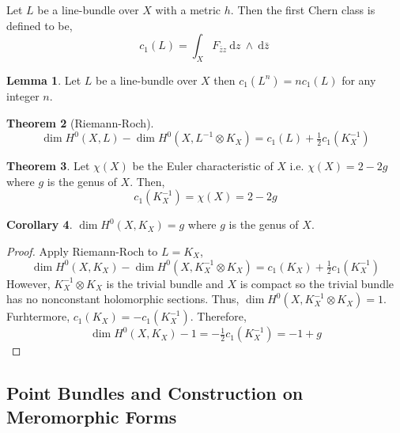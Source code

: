 \documentclass[12pt]{extarticle}
\renewcommand{\d}[1]{\: \mathrm{d}#1 \:}
\theoremstyle{definition}
\newtheorem{theorem}{Theorem}[section]
\newtheorem{lemma}[theorem]{Lemma}
\newtheorem{corollary}[theorem]{Corollary}
\newenvironment{definition}[1][Definition:]{\begin{trivlist}
\item[\hskip \labelsep {\bfseries #1}]}{\end{trivlist}}
\begin{document}
\begin{definition}
Let $L$ be a line-bundle over $X$ with a metric $h$. Then the first Chern class is defined to be,
\[ c_1(L) = \int_X F_{\bar{z}z} \d{z} \wedge \d{\bar{z}} \]
\end{definition}

\begin{lemma}
Let $L$ be a line-bundle over $X$ then $c_1(L^n) = n c_1(L)$ for any integer $n$. 
\end{lemma}


\begin{theorem}[Riemann-Roch]
\[ \dim{H^0(X, L)} - \dim{H^0(X, L^{-1} \otimes K_X)} = c_1(L) + \tfrac{1}{2} c_1(K_X^{-1}) \]
\end{theorem}

\begin{theorem}
Let $\chi(X)$ be the Euler characteristic of $X$ i.e. $\chi(X) = 2 - 2g$ where $g$ is the genus of $X$. Then,
\[ c_1(K_X^{-1}) = \chi(X) = 2 - 2 g \]
\end{theorem}

\begin{corollary}
$\dim{H^0(X, K_X)} = g$ where $g$ is the genus of $X$.
\end{corollary}

\begin{proof}
Apply Riemann-Roch to $L = K_X$,
\[ \dim{H^0(X, K_X)} - \dim{H^0(X, K_X^{-1} \otimes K_X)} = c_1(K_X) + \tfrac{1}{2} c_1(K_X^{-1}) \]
However, $K_X^{-1} \otimes K_X$ is the trivial bundle and $X$ is compact so the trivial bundle has no nonconstant holomorphic sections. Thus, $\dim{H^0(X, K_X^{-1} \otimes K_X)} = 1$. Furhtermore, $c_1(K_X) = - c_1(K_X^{-1})$. Therefore,
\[ \dim{H^0(X, K_X)} - 1 = - \tfrac{1}{2} c_1(K_X^{-1}) = -1 + g \]
\end{proof}

\subsection{Point Bundles and Construction on Meromorphic Forms}
\end{document}
